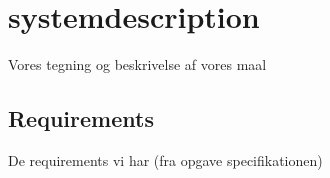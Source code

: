 \chapter{systemdescription}
Vores tegning og beskrivelse af vores maal

\section{Requirements}
De requirements vi har (fra opgave specifikationen)